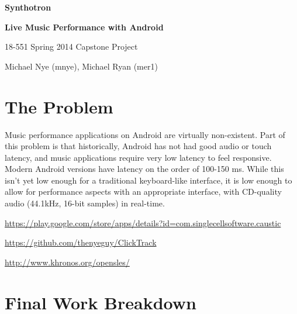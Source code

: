 \documentclass[letterpaper,12pt]{article}
\begin{document}
\begin{center}
    \par{\bf \LARGE Synthotron}
    \par{\bf \large Live Music Performance with Android}
    \par{\large 18-551 Spring 2014 Capstone Project}
    \par{\large Michael Nye (mnye), Michael Ryan (mer1)}
\end{center}


\section*{The Problem}

Music performance applications on Android are virtually non-existent. Part of
this problem is that historically, Android has not had good audio or touch
latency, and music applications require very low latency to feel responsive.
Modern Android versions have latency on the order of 100-150 ms. While this
isn't yet low enough for a traditional keyboard-like interface, it is low enough
to allow for performance aspects with an appropriate interface, with CD-quality
audio (44.1kHz, 16-bit samples) in real-time.



\begin{thebibliography}{9}
    \singlespacing
    \url{https://play.google.com/store/apps/details?id=com.singlecellsoftware.caustic}

    \url{https://github.com/thenyeguy/ClickTrack}

    \url{http://www.khronos.org/opensles/}

\end{thebibliography}


\section*{Final Work Breakdown}
\end{document}
